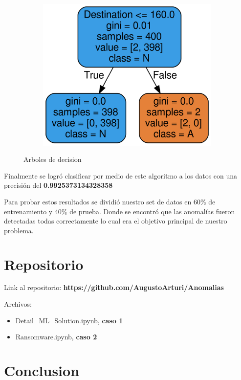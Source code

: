 \documentclass[a4paper,10pt]{article}
\begin{document}
\begin{figure}[!hbp]
\begin{subfigure}{.5\textwidth}
\end{subfigure}
\begin{subfigure}{.5\textwidth}
  \centering
  \includegraphics[width=.8\linewidth]{Wireshark/Tres/6.png}
  \caption{}
  \label{fig:sfig2}
\end{subfigure}

\caption{Arboles de decision}
\label{fig:fig}
\end{figure}

Finalmente se logró clasificar por medio de este algoritmo a los datos con una precisión del \textbf{0.9925373134328358}

\medskip

\normalsize Para probar estos resultados se dividió nuestro set de datos en 60\% de entrenamiento y 40\% de prueba. Donde se encontró que las anomalías fueron detectadas todas correctamente lo cual era el objetivo principal de nuestro problema.

\section{Repositorio}
Link al repositorio: \textbf{https://github.com/AugustoArturi/Anomalias}

Archivos:
\begin{itemize}
\item{Detail\_ML\_Solution.ipynb, \textbf{caso 1}}
\item{Ransomware.ipynb, \textbf{caso 2}}
\end{itemize}

\section{Conclusion}
\end{document}
